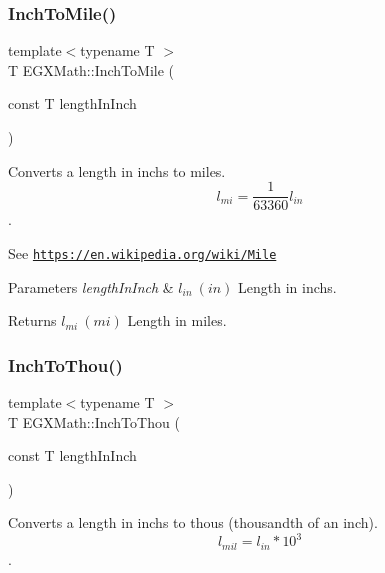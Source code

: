\subsubsection{\texorpdfstring{Inch\+To\+Mile()}{InchToMile()}}
{\footnotesize\ttfamily template$<$typename T $>$ \\
T E\+G\+X\+Math\+::\+Inch\+To\+Mile (\begin{DoxyParamCaption}\item[{const T}]{length\+In\+Inch }\end{DoxyParamCaption})}



Converts a length in inchs to miles. \[ l_{mi}=\frac{1}{63360} l_{in} \]. 

See \href{https://en.wikipedia.org/wiki/Mile}{\tt https\+://en.\+wikipedia.\+org/wiki/\+Mile} 
\begin{DoxyParams}{Parameters}
{\em length\+In\+Inch} & $ l_{in}\ (in)$ Length in inchs. \\
\hline
\end{DoxyParams}
\begin{DoxyReturn}{Returns}
$ l_{mi}\ (mi)$ Length in miles. 
\end{DoxyReturn}
\mbox{\label{group___e_g_x_math-_conversions-_length_conversions-_imperial-_inch-_imperial_ga2f69d70d71ea01a37e6b8c97c0a95204}} 
\subsubsection{\texorpdfstring{Inch\+To\+Thou()}{InchToThou()}}
{\footnotesize\ttfamily template$<$typename T $>$ \\
T E\+G\+X\+Math\+::\+Inch\+To\+Thou (\begin{DoxyParamCaption}\item[{const T}]{length\+In\+Inch }\end{DoxyParamCaption})}



Converts a length in inchs to thous (thousandth of an inch). \[ l_{mil}= l_{in} * 10^{3} \]. 

